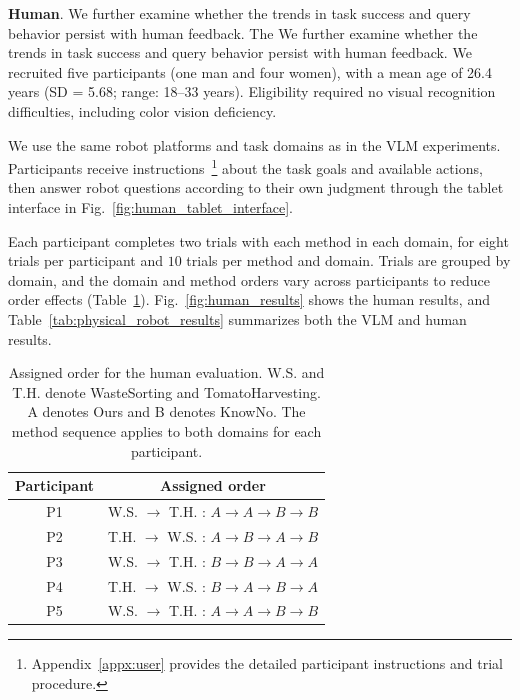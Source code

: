 






\vspace{10pt}
\noindent\textbf{Human}\label{exp:human_eval}. We further examine whether the trends in task success and query behavior persist with human feedback. The We further examine whether the trends in task success and query behavior persist with human feedback. We recruited five participants (one man and four women), with a mean age of 26.4 years (SD = 5.68; range: 18--33 years). Eligibility required no visual recognition difficulties, including color vision deficiency.


We use the same robot platforms and task domains as in the VLM experiments. Participants receive instructions~\footnote{Appendix~\ref{appx:user} provides the detailed participant instructions and trial procedure.} about the task goals and available actions, then answer robot questions according to their own judgment through the tablet interface in Fig.~\ref{fig:human_tablet_interface}.


Each participant completes two trials with each method in each domain, for eight trials per participant and $10$ trials per method and domain. Trials are grouped by domain, and the domain and method orders vary across participants to reduce order effects (Table~\ref{tab:human_assignment}). Fig.~\ref{fig:human_results} shows the human results, and Table~\ref{tab:physical_robot_results} summarizes both the VLM and human results.

\begin{table}[!htbp]
\centering
\caption{Assigned order for the human evaluation. W.S. and T.H. denote WasteSorting and TomatoHarvesting. A denotes Ours and B denotes KnowNo. The method sequence applies to both domains for each participant.}
\label{tab:human_assignment}
\small
\setlength{\tabcolsep}{3pt}
\begin{tabular*}{\columnwidth}{@{\extracolsep{\fill}}cc@{}}
\toprule
Participant & Assigned order \\
\midrule
P1 & W.S. $\rightarrow$ T.H. : $A\rightarrow A\rightarrow B\rightarrow B$ \\
P2 & T.H. $\rightarrow$ W.S. : $A\rightarrow B\rightarrow A\rightarrow B$ \\
P3 & W.S. $\rightarrow$ T.H. : $B\rightarrow B\rightarrow A\rightarrow A$ \\
P4 & T.H. $\rightarrow$ W.S. : $B\rightarrow A\rightarrow B\rightarrow A$ \\
P5 & W.S. $\rightarrow$ T.H. : $A\rightarrow A\rightarrow B\rightarrow B$ \\
\bottomrule
\end{tabular*}
\end{table}



